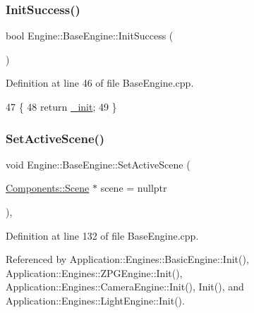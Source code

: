\subsubsection{\texorpdfstring{Init\+Success()}{InitSuccess()}}
{\footnotesize\ttfamily bool Engine\+::\+Base\+Engine\+::\+Init\+Success (\begin{DoxyParamCaption}{ }\end{DoxyParamCaption})\hspace{0.3cm}{\ttfamily [inherited]}}



Definition at line 46 of file Base\+Engine.\+cpp.


\begin{DoxyCode}
47 \{
48     \textcolor{keywordflow}{return} \mbox{\hyperlink{classEngine_1_1BaseEngine_a79e265845b321c0e9822fb170c564e55}{\_init}};
49 \}
\end{DoxyCode}
\mbox{\label{classEngine_1_1BaseEngine_afc82c6a00d5a9d4714740fc5eab5db86}} 
\subsubsection{\texorpdfstring{Set\+Active\+Scene()}{SetActiveScene()}}
{\footnotesize\ttfamily void Engine\+::\+Base\+Engine\+::\+Set\+Active\+Scene (\begin{DoxyParamCaption}\item[{\mbox{\hyperlink{classEngine_1_1Components_1_1Scene}{Components\+::\+Scene}} $\ast$}]{scene = {\ttfamily nullptr} }\end{DoxyParamCaption})\hspace{0.3cm}{\ttfamily [virtual]}, {\ttfamily [inherited]}}



Definition at line 132 of file Base\+Engine.\+cpp.



Referenced by Application\+::\+Engines\+::\+Basic\+Engine\+::\+Init(), Application\+::\+Engines\+::\+Z\+P\+G\+Engine\+::\+Init(), Application\+::\+Engines\+::\+Camera\+Engine\+::\+Init(), Init(), and Application\+::\+Engines\+::\+Light\+Engine\+::\+Init().


